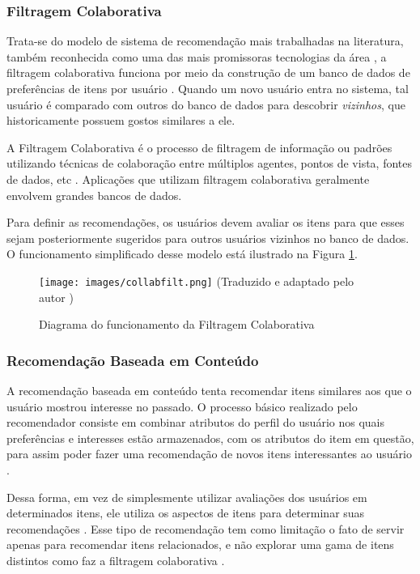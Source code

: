 \documentclass[
	12pt,				%
	oneside,			%
	a4paper,			%
	chapter=TITLE,		%
	english,			%
	french,				%
	spanish,			%
	brazil				%
	]{abntex2}
\begin{document}
\subsubsection{Filtragem Colaborativa}

Trata-se do modelo de sistema de recomendação mais trabalhadas na literatura, também reconhecida como uma das mais promissoras tecnologias da área \cite{isinkaye2015recommendation, resnick1997recommender, schafer1999recommender}, a filtragem colaborativa funciona por meio da construção de um banco de dados de preferências de itens por usuário \cite{sarwar2002recommender}. Quando um novo usuário entra no sistema, tal usuário é comparado com outros do banco de dados para descobrir \emph{vizinhos}, que historicamente possuem gostos similares a ele.

A Filtragem Colaborativa é o processo de filtragem de informação ou padrões utilizando técnicas de colaboração entre múltiplos agentes, pontos de vista, fontes de dados, etc \cite{terveen2001beyond}. Aplicações que utilizam filtragem colaborativa geralmente envolvem grandes bancos de dados.

Para definir as recomendações, os usuários devem avaliar os itens \cite{herlocker2004evaluating, burke2007hybrid} para que esses sejam posteriormente sugeridos para outros usuários vizinhos no banco de dados. O funcionamento simplificado desse modelo está ilustrado na Figura \ref{fig:collabfilt}.

\begin{figure}[H]
    \centering
    \caption{Diagrama do funcionamento da Filtragem Colaborativa}
    \texttt{[image: images/collabfilt.png]}
    \label{fig:collabfilt}
    \textual (Traduzido e adaptado pelo autor \cite{wikimedia2})
\end{figure}

\subsubsection{Recomendação Baseada em Conteúdo}

A recomendação baseada em conteúdo tenta recomendar itens similares aos que o usuário mostrou interesse no passado. O processo básico realizado pelo recomendador consiste em combinar atributos do perfil do usuário nos quais preferências e interesses estão armazenados, com os atributos do item em questão, para assim poder fazer uma recomendação de novos itens interessantes ao usuário \cite{pazzani2007content}.

Dessa forma, em vez de simplesmente utilizar avaliações dos usuários em determinados itens, ele utiliza os aspectos de itens para determinar suas recomendações \cite{burke2007hybrid}. Esse tipo de recomendação tem como limitação o fato de servir apenas para recomendar itens relacionados, e não explorar uma gama de itens distintos como faz a filtragem colaborativa \cite{balabanovic1997fab}.
\end{document}

